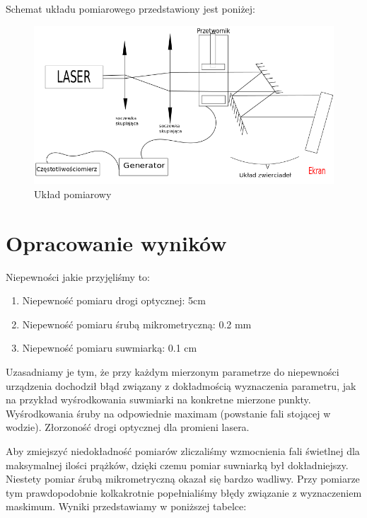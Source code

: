 \documentclass[a4paper,12pt]{article}
\begin{document}
Schemat układu pomiarowego przedstawiony jest poniżej: 

\begin{figure} [H]
  \begin{center}
    \includegraphics[width = 15cm]{Rysunek.png}
    \caption{Układ pomiarowy}
  \end{center}
\end{figure}



\section{Opracowanie wyników}

Niepewności jakie przyjęliśmy to:
\begin{enumerate}
  \item Niepewność pomiaru drogi optycznej: 5cm 
  \item Niepewność pomiaru śrubą mikrometryczną: 0.2 mm 
  \item Niepewność pomiaru suwmiarką: 0.1 cm 
  
\end{enumerate}

Uzasadniamy je tym, że przy każdym mierzonym parametrze do niepewności urządzenia dochodził błąd związany z dokładmością wyznaczenia parametru, jak na przykład wyśrodkowania suwmiarki na konkretne mierzone punkty. Wyśrodkowania śruby na odpowiednie maximam (powstanie fali stojącej w wodzie). Złorzoność drogi optycznej dla promieni lasera. 

Aby zmiejszyć niedokładność pomiarów zliczaliśmy wzmocnienia fali świetlnej dla maksymalnej ilości prążków, dzięki czemu pomiar suwniarką był dokładniejszy. Niestety pomiar śrubą mikrometryczną okazał się bardzo wadliwy. Przy pomiarze tym prawdopodobnie kolkakrotnie popełnialiśmy błędy związanie z wyznaczeniem maskimum. Wyniki przedstawiamy w poniższej tabelce: 
\end{document}
